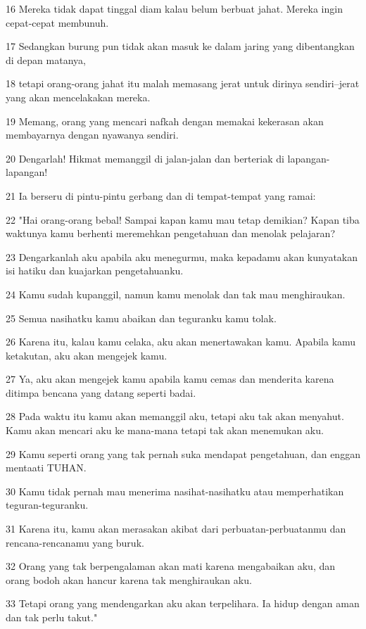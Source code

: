 \par 16 Mereka tidak dapat tinggal diam kalau belum berbuat jahat. Mereka ingin cepat-cepat membunuh.
\par 17 Sedangkan burung pun tidak akan masuk ke dalam jaring yang dibentangkan di depan matanya,
\par 18 tetapi orang-orang jahat itu malah memasang jerat untuk dirinya sendiri--jerat yang akan mencelakakan mereka.
\par 19 Memang, orang yang mencari nafkah dengan memakai kekerasan akan membayarnya dengan nyawanya sendiri.
\par 20 Dengarlah! Hikmat memanggil di jalan-jalan dan berteriak di lapangan-lapangan!
\par 21 Ia berseru di pintu-pintu gerbang dan di tempat-tempat yang ramai:
\par 22 "Hai orang-orang bebal! Sampai kapan kamu mau tetap demikian? Kapan tiba waktunya kamu berhenti meremehkan pengetahuan dan menolak pelajaran?
\par 23 Dengarkanlah aku apabila aku menegurmu, maka kepadamu akan kunyatakan isi hatiku dan kuajarkan pengetahuanku.
\par 24 Kamu sudah kupanggil, namun kamu menolak dan tak mau menghiraukan.
\par 25 Semua nasihatku kamu abaikan dan teguranku kamu tolak.
\par 26 Karena itu, kalau kamu celaka, aku akan menertawakan kamu. Apabila kamu ketakutan, aku akan mengejek kamu.
\par 27 Ya, aku akan mengejek kamu apabila kamu cemas dan menderita karena ditimpa bencana yang datang seperti badai.
\par 28 Pada waktu itu kamu akan memanggil aku, tetapi aku tak akan menyahut. Kamu akan mencari aku ke mana-mana tetapi tak akan menemukan aku.
\par 29 Kamu seperti orang yang tak pernah suka mendapat pengetahuan, dan enggan mentaati TUHAN.
\par 30 Kamu tidak pernah mau menerima nasihat-nasihatku atau memperhatikan teguran-teguranku.
\par 31 Karena itu, kamu akan merasakan akibat dari perbuatan-perbuatanmu dan rencana-rencanamu yang buruk.
\par 32 Orang yang tak berpengalaman akan mati karena mengabaikan aku, dan orang bodoh akan hancur karena tak menghiraukan aku.
\par 33 Tetapi orang yang mendengarkan aku akan terpelihara. Ia hidup dengan aman dan tak perlu takut."

